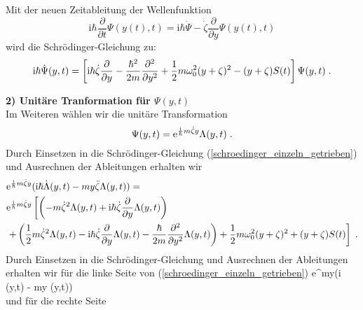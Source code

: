     Mit der neuen Zeitableitung der Wellenfunktion
    \begin{equation}
      \text{i}\hbar \frac{\partial}{\partial t} \Psi(y(t),t) = \text{i}\hbar \dot{\Psi} -\dot{\zeta}\frac{\partial}{\partial y}\Psi(y(t),t)
    \end{equation}
    wird die Schrödinger-Gleichung zu:
    \begin{equation}
      \text i \hbar \dot{\Psi}(y,t) = \left[\text i \hbar \dot{\zeta}\frac{\partial}{\partial y}-\frac{\hbar^2}{2m}\frac{\partial^2}{\partial y^2}+\frac{1}{2}m\omega_0^2(y+\zeta)^2-(y+\zeta)S(t)\right]\Psi(y,t) \; .
      \label{schroedinger_einzeln_getrieben}
    \end{equation}

    \textbf{2) Unitäre Tranformation für $\Psi(y,t)$}\\
    Im Weiteren wählen wir die unitäre Transformation
    \begin{equation}
      \Psi(y,t) = \text e^{\frac{\text i}{\hbar}m\dot \zeta y}\Lambda(y,t) \; .
    \end{equation}
    Durch Einsetzen in die Schrödinger-Gleichung (\ref{schroedinger_einzeln_getrieben}) und Ausrechnen der Ableitungen erhalten wir
    \begin{align}
      \begin{split}
        &\text e^{\frac{\text i}{\hbar}m\dot \zeta y}(\text i \hbar \dot \Lambda(y,t) - my \ddot{\zeta}\Lambda(y,t)) =\\
         &\text e^{\frac{\text i}{\hbar}m\dot \zeta y} \left[\left(-m\dot \zeta^2 \Lambda(y,t) + \text i \hbar \dot \zeta \frac{\partial}{\partial y} \Lambda(y,t) \right) \right. \\
         &\left. + \left(\frac{1}{2}m\dot \zeta^2 \Lambda(y,t) - \text{i} \hbar \dot \zeta \frac{\partial}{\partial y} \Lambda(y,t) - \frac{\hbar}{2m}\frac{\partial^2}{\partial y^2} \Lambda(y,t)  \right)
        + \frac{1}{2}m\omega_0^2(y+\zeta)^2  + (y+\zeta)S(t)  \right] \; .
      \end{split}
    \end{align}
    \iffalse
    Durch Einsetzen in die Schrödinger-Gleichung und Ausrechnen der Ableitungen erhalten wir für die linke Seite von (\ref{schroedinger_einzeln_getrieben})
    \text e^{m\dot \zeta y}(\text i \hbar \dot \Lambda(y,t) - my \ddot{\zeta}\Lambda(y,t))
    \begin{equation}
    \end{equation}
    und für die rechte Seite
